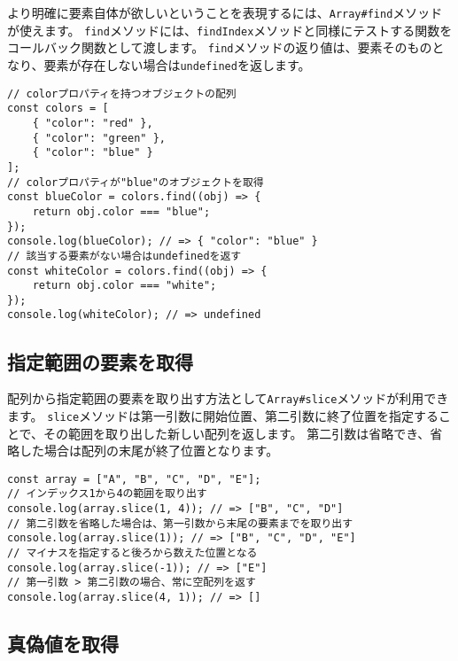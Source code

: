 より明確に要素自体が欲しいということを表現するには、\texttt{Array\#find}メソッド\,\protect{}\,が使えます。
\texttt{find}メソッドには、\texttt{findIndex}メソッドと同様にテストする関数をコールバック関数として渡します。
\texttt{find}メソッドの返り値は、要素そのものとなり、要素が存在しない場合は\texttt{undefined}を返します。

\begin{lstlisting}
// colorプロパティを持つオブジェクトの配列
const colors = [
    { "color": "red" },
    { "color": "green" },
    { "color": "blue" }
];
// colorプロパティが"blue"のオブジェクトを取得
const blueColor = colors.find((obj) => {
    return obj.color === "blue";
});
console.log(blueColor); // => { "color": "blue" }
// 該当する要素がない場合はundefinedを返す
const whiteColor = colors.find((obj) => {
    return obj.color === "white";
});
console.log(whiteColor); // => undefined
\end{lstlisting}

\hypertarget{slice}{%
\subsection{指定範囲の要素を取得}\label{slice}}

配列から指定範囲の要素を取り出す方法として\texttt{Array\#slice}メソッドが利用できます。
\texttt{slice}メソッドは第一引数に開始位置、第二引数に終了位置を指定することで、その範囲を取り出した新しい配列を返します。
第二引数は省略でき、省略した場合は配列の末尾が終了位置となります。

\begin{lstlisting}
const array = ["A", "B", "C", "D", "E"];
// インデックス1から4の範囲を取り出す
console.log(array.slice(1, 4)); // => ["B", "C", "D"]
// 第二引数を省略した場合は、第一引数から末尾の要素までを取り出す
console.log(array.slice(1)); // => ["B", "C", "D", "E"]
// マイナスを指定すると後ろから数えた位置となる
console.log(array.slice(-1)); // => ["E"]
// 第一引数 > 第二引数の場合、常に空配列を返す
console.log(array.slice(4, 1)); // => []
\end{lstlisting}

\hypertarget{get-boolean}{%
\subsection{真偽値を取得}\label{get-boolean}}

